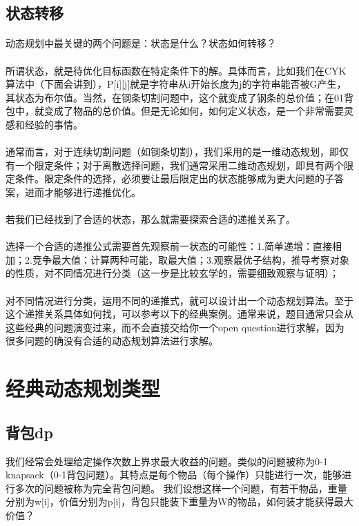 \documentclass[12pt,a4paper,UTF16]{ctexbook}
\theoremstyle{plain}
\begin{document}
\subsection{状态转移}
\paragraph{}动态规划中最关键的两个问题是：状态是什么？状态如何转移？
\paragraph{}所谓状态，就是待优化目标函数在特定条件下的解。具体而言，比如我们在CYK算法中（下面会讲到），P[i][j]就是字符串从i开始长度为j的字符串能否被G产生，其状态为布尔值。当然，在钢条切割问题中，这个就变成了钢条的总价值；在01背包中，就变成了物品的总价值。但是无论如何，如何定义状态，是一个非常需要灵感和经验的事情。
\paragraph{}通常而言，对于连续切割问题（如钢条切割），我们采用的是一维动态规划，即仅有一个限定条件；对于离散选择问题，我们通常采用二维动态规划，即具有两个限定条件。限定条件的选择，必须要让最后限定出的状态能够成为更大问题的子答案，进而才能够进行递推优化。
\paragraph{}若我们已经找到了合适的状态，那么就需要探索合适的递推关系了。
\paragraph{}选择一个合适的递推公式需要首先观察前一状态的可能性：1.简单递增：直接相加；2.竞争最大值：计算两种可能，取最大值；3.观察最优子结构，推导考察对象的性质，对不同情况进行分类（这一步是比较玄学的，需要细致观察与证明）；
\paragraph{}对不同情况进行分类，运用不同的递推式，就可以设计出一个动态规划算法。至于这个递推关系具体如何找，可以参考以下的经典案例。通常来说，题目通常只会从这些经典的问题演变过来，而不会直接交给你一个open question进行求解，因为很多问题的确没有合适的动态规划算法进行求解。
\section{经典动态规划类型}
\subsection{背包dp}
我们经常会处理给定操作次数上界求最大收益的问题。类似的问题被称为0-1 knapsack（0-1背包问题）。其特点是每个物品（每个操作）只能进行一次，能够进行多次的问题被称为完全背包问题。
我们设想这样一个问题，有若干物品，重量分别为w[i]，价值分别为p[i]，背包只能装下重量为W的物品，如何装才能获得最大价值？
\end{document}
